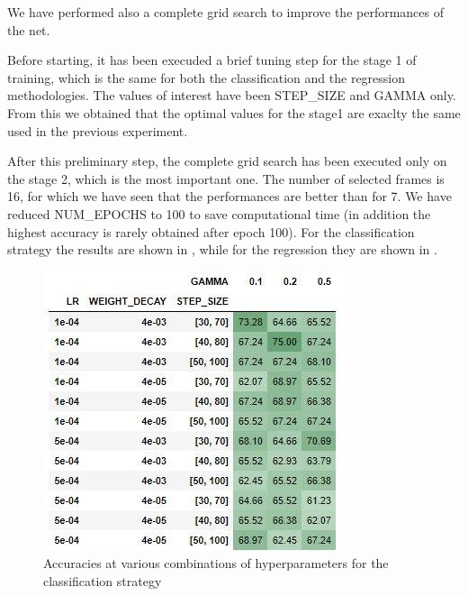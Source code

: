 \documentclass[10pt,twocolumn,hidelinks,letterpaper]{article}
\begin{document}
We have performed also a complete grid search to improve the performances of the net.

Before starting, it has been execuded a brief tuning step for the stage 1 of training, which is the same for both the classification and the regression methodologies. The values of interest have been STEP\_SIZE and GAMMA only. From this we obtained that the optimal values for the stage1 are exaclty the same used in the previous experiment.

After this preliminary step, the complete grid search has been executed only on the stage 2, which is the most important one. The number of selected frames is 16, for which we have seen that the performances are better than for 7. We have reduced NUM\_EPOCHS to 100 to save computational time (in addition the highest accuracy is rarely obtained after epoch 100). For the classification strategy the results are shown in , while for the regression they are shown in .

\begin{figure}[t]
	\centering
	\includegraphics[width=\linewidth]{images/grid_no_reg_table.jpg}
	\caption{Accuracies at various combinations of hyperparameters for the classification strategy}
	\label{ms_grid}
\end{figure}
\end{document}
